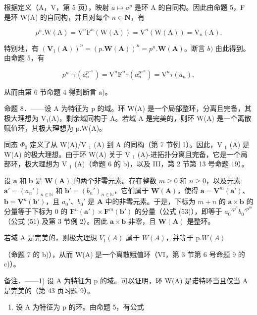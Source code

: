 根据定义（A，V，第 5 页），映射 \(a \mapsto a^{p}\) 是环 A 的自同构。因此由命题 5，F 是环 W(A) 的自同构，并且对每个 \(n \in \mathbf{N}\)，有

\[
p ^ {n}. \mathrm{W} (\mathrm{A}) = \mathrm{V} ^ {n} \mathrm{F} ^ {n} (\mathrm{W} (\mathrm{A})) = \mathrm{V} ^ {n} (\mathrm{W} (\mathrm{A})) = \mathrm{V} _ {n} (\mathrm{A}).
\]

特别地，有 \((\mathbf{V}_1(\mathbf{A}))^n = (p.\mathbf{W}(\mathbf{A}))^n = p^n.\mathbf{W}(\mathbf{A})\)。断言 \(b)\) 由此得到。由命题 5，有

\[
p ^ {n} \cdot \tau (a _ {n} ^ {p ^ {- n}}) = \mathrm{V} ^ {n} \mathrm{F} ^ {n} \tau (a _ {n} ^ {p ^ {- n}}) = \mathrm{V} ^ {n} \tau (a _ {n}),
\]

从而由第 6 节命题 4 得到断言 a)。

命题 8．——设 A 为特征为 p 的域。环 W(A) 是一个局部整环，分离且完备，其极大理想为 V₁(A)，剩余域同构于 A。若域 A 是完美的，则环 W(A) 是一个离散赋值环，其极大理想为 p.W(A)。

同态 \(\Phi_{0}\) 定义了从 W(A)/V \(_{1}\) (A) 到 A 的同构（第 7 节例 1）。因此，V \(_{1}\) (A) 是 W(A) 的极大理想。由于环 W(A) 关于 V \(_{1}\) (A)-进拓扑分离且完备，它是一个局部环，极大理想为 V \(_{1}\) (A)（命题 6 的 b)，以及 III，第 2 节第 13 号命题 19）。

设 \(\pmb{a}\) 和 \(\pmb{b}\) 是 \(\mathbf{W}(\mathbf{A})\) 的两个非零元素。存在整数 \(m \geqslant 0\) 和 \(n \geqslant 0\)，以及元素 \(\pmb{a}' = (a_n')_{n \in \mathbb{N}}\) 和 \(\pmb{b}' = (b_n')_{n \in \mathbb{N}}\)，它们属于 \(\mathbf{W}(\mathbf{A})\)，使得 \(\pmb{a} = \mathbf{V}^m(\pmb{a}')\)、\(\pmb{b} = \mathbf{V}^n(\pmb{b}')\)，且 \(a_0'\)、\(b_0'\) 是 \(\mathbf{A}\) 中的非零元素。于是，下标为 \(m + n\) 的 \(\pmb{a} \times \pmb{b}\) 的分量等于下标为 0 的 \(\mathbf{F}^n(\pmb{a}') \times \mathbf{F}^m(\pmb{b}')\) 的分量（公式 (53)），即等于 \(a_0'^{p^n} b_0'^{p^m}\)（公式 (51) 及第 3 节例 2）。因此 \(\pmb{a} \times \pmb{b}\) 非零，且 \(\mathbf{W}(\mathbf{A})\) 是整环。

若域 A 是完美的，则极大理想 \(V_{1}(A)\) 属于 \(W(A)\)，并等于 p.\(W(A)\)

（命题 7 的 b)），从而 W(A) 是一个离散赋值环（VI，第 3 节第 6 号命题 9 的 c)）。

备注．——1) 设 A 为特征为 p 的域。可以证明，环 W(A) 是诺特环当且仅当 A 是完美的（第 43 页习题 9）。

\begin{enumerate}
\def\labelenumi{\arabic{enumi})}
\setcounter{enumi}{1}
\tightlist
\item
  设 A 为特征为 p 的环。由命题 5，有公式
\end{enumerate}

